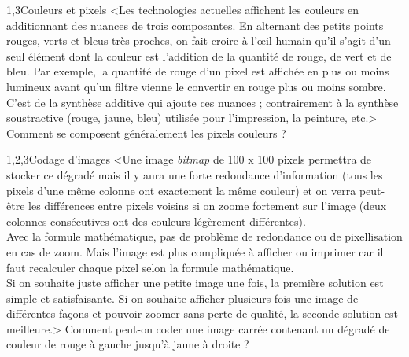 \begin{quiz}[title={Infographie et audionumérique}]
\begin{quizquestion*}[b]{2}{1,3}{Couleurs et pixels}
<Les technologies actuelles affichent les couleurs en additionnant des nuances de trois composantes. En alternant des petits points rouges, verts et bleus très proches, on fait croire à l’œil humain qu'il s'agit d'un seul élément dont la couleur est l'addition de la quantité de rouge, de vert et de bleu. Par exemple, la quantité de rouge d'un pixel est affichée en plus ou moins lumineux avant qu'un filtre vienne le convertir en rouge plus ou moins sombre.
C'est de la synthèse additive qui ajoute ces nuances ; contrairement à la synthèse soustractive (rouge, jaune, bleu) utilisée pour l'impression, la peinture, etc.>
Comment se composent généralement les pixels couleurs ?
\end{quizquestion*}

\begin{quizquestion}[c]{1,2,3}{}{Codage d'images}
<Une image \textit{bitmap} de 100 x 100 pixels permettra de stocker ce dégradé mais il y aura une forte redondance d'information (tous les pixels d'une même colonne ont exactement la même couleur) et on verra peut-être les différences entre pixels voisins si on zoome fortement sur l'image (deux colonnes consécutives ont des couleurs légèrement différentes).\\
Avec la formule mathématique, pas de problème de redondance ou de pixellisation en cas de zoom. Mais l'image est plus compliquée à afficher ou imprimer car il faut recalculer chaque pixel selon la formule mathématique.\\
Si on souhaite juste afficher une petite image une fois, la première solution est simple et satisfaisante. Si on souhaite afficher plusieurs fois une image de différentes façons et pouvoir zoomer sans perte de qualité, la seconde solution est meilleure.>
Comment peut-on coder une image carrée contenant un dégradé de couleur de rouge à gauche jusqu'à jaune à droite ?
\end{quizquestion}


\end{quiz}
